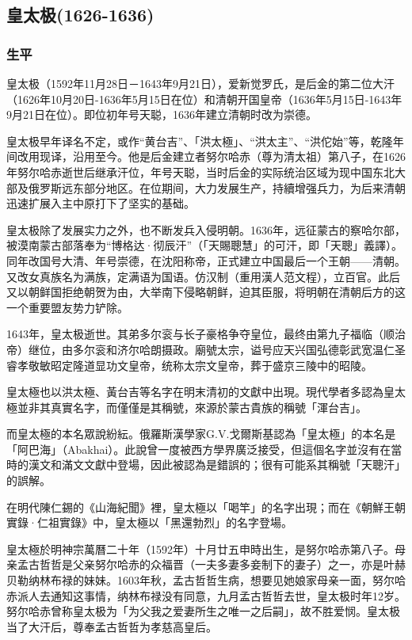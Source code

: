 \subsection{皇太极\tiny(1626-1636)}

\subsubsection{生平}

皇太极（1592年11月28日－1643年9月21日），爱新觉罗氏，是后金的第二位大汗（1626年10月20日-1636年5月15日在位）和清朝开国皇帝（1636年5月15日-1643年9月21日在位）。即位初年号天聪，1636年建立清朝时改为崇德。

皇太极早年译名不定，或作“黄台吉”、「洪太極」、“洪太主”、“洪佗始”等，乾隆年间改用现译，沿用至今。他是后金建立者努尔哈赤（尊为清太祖）第八子，在1626年努尔哈赤逝世后继承汗位，年号天聪，当时后金的实际统治区域为现中国东北大部及俄罗斯远东部分地区。在位期间，大力发展生产，持續增强兵力，为后来清朝迅速扩展入主中原打下了坚实的基础。

皇太极除了发展实力之外，也不断发兵入侵明朝。1636年，远征蒙古的察哈尔部，被漠南蒙古部落奉为“博格达·彻辰汗”（「天賜聰慧」的可汗，即「天聰」義譯）。同年改国号大清、年号崇德，在沈阳称帝，正式建立中国最后一个王朝——清朝。又改女真族名为满族，定满语为国语。仿汉制（重用漢人范文程），立百官。此后又以朝鲜国拒绝朝贺为由，大举南下侵略朝鲜，迫其臣服，将明朝在清朝后方的这一个重要盟友势力铲除。

1643年，皇太极逝世。其弟多尔衮与长子豪格争夺皇位，最终由第九子福临（顺治帝）继位，由多尔衮和济尔哈朗摄政。廟號太宗，谥号应天兴国弘德彰武宽温仁圣睿孝敬敏昭定隆道显功文皇帝，统称太宗文皇帝，葬于盛京三陵中的昭陵。

皇太極也以洪太極、黃台吉等名字在明末清初的文獻中出現。現代學者多認為皇太極並非其真實名字，而僅僅是其稱號，來源於蒙古貴族的稱號「渾台吉」。

而皇太極的本名眾說紛紜。俄羅斯漢學家G.V.戈爾斯基認為「皇太極」的本名是「阿巴海」（Abakhai）。此說曾一度被西方學界廣泛接受，但這個名字並沒有在當時的漢文和滿文文獻中登場，因此被認為是錯誤的；很有可能系其稱號「天聰汗」的誤解。

在明代陳仁錫的《山海紀聞》裡，皇太極以「喝竿」的名字出現；而在《朝鮮王朝實錄·仁祖實錄》中，皇太極以「黑還勃烈」的名字登場。

皇太極於明神宗萬曆二十年（1592年）十月廿五申時出生，是努尔哈赤第八子。母亲孟古哲哲是父亲努尔哈赤的众福晋（一夫多妻多妾制下的妻子）之一，亦是叶赫贝勒纳林布禄的妹妹。1603年秋，孟古哲哲生病，想要见她娘家母亲一面，努尔哈赤派人去通知这事情，纳林布禄没有同意，九月孟古哲哲去世，皇太极时年12岁。努尔哈赤曾称皇太极为「为父我之爱妻所生之唯一之后嗣」，故不胜爱悯。皇太极当了大汗后，尊奉孟古哲哲为孝慈高皇后。


